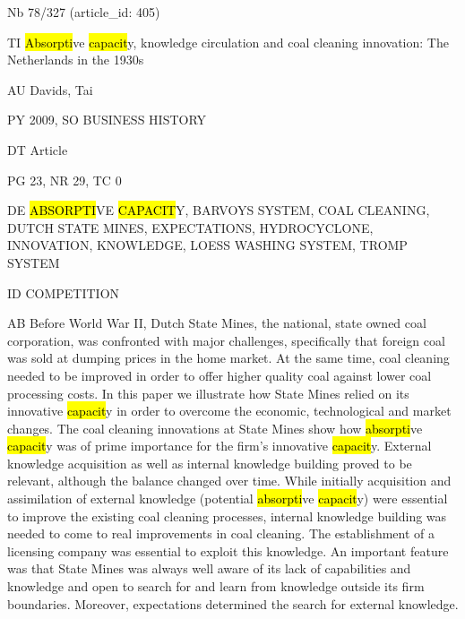 \documentclass[a4paper]{article}
\begin{document}
\vspace*{-2cm}
Nb \tabto{0cm}78/327 (article\_id: 405)\par
TI \tabto{0cm}\hl{Absorpti}ve \hl{capacit}y, knowledge circulation and coal cleaning innovation: The Netherlands in the 1930s\par
AU \tabto{0cm}Davids, Tai\par
PY \tabto{0cm}2009, SO BUSINESS HISTORY\par
DT \tabto{0cm}Article\par
PG \tabto{0cm}23, NR 29, TC 0\par
DE \tabto{0cm}\hl{ABSORPTI}VE \hl{CAPACIT}Y, BARVOYS SYSTEM, COAL CLEANING, DUTCH STATE MINES, EXPECTATIONS, HYDROCYCLONE, INNOVATION, KNOWLEDGE, LOESS WASHING SYSTEM, TROMP SYSTEM\par
ID \tabto{0cm}COMPETITION\par
AB \tabto{0cm}Before World War II, Dutch State Mines, the national, state owned coal corporation, was confronted with major challenges, specifically that foreign coal was sold at dumping prices in the home market. At the same time, coal cleaning needed to be improved in order to offer higher quality coal against lower coal processing costs. In this paper we illustrate how State Mines relied on its innovative \hl{capacit}y in order to overcome the economic, technological and market changes. The coal cleaning innovations at State Mines show how \hl{absorpti}ve \hl{capacit}y was of prime importance for the firm's innovative \hl{capacit}y. External knowledge acquisition as well as internal knowledge building proved to be relevant, although the balance changed over time. While initially acquisition and assimilation of external knowledge (potential \hl{absorpti}ve \hl{capacit}y) were essential to improve the existing coal cleaning processes, internal knowledge building was needed to come to real improvements in coal cleaning. The establishment of a licensing company was essential to exploit this knowledge. An important feature was that State Mines was always well aware of its lack of capabilities and knowledge and open to search for and learn from knowledge outside its firm boundaries. Moreover, expectations determined the search for external knowledge.\par
\clearpage
\end{document}
